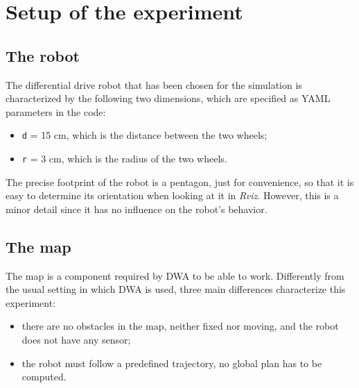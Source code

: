 \documentclass[11pt,a4paper]{article}
\begin{document}

\section{Setup of the experiment}



\subsection{The robot}

The differential drive robot that has been chosen for the simulation is characterized by the following
two dimensions, which are specified as YAML parameters in the code:
\begin{itemize}
    \item \texttt{d} = 15 cm, which is the distance between the two wheels;
    \item \texttt{r} = 3 cm, which is the radius of the two wheels.\\
\end{itemize}

The precise footprint of the robot is a pentagon, just for convenience, so that it is easy to determine its
orientation when looking at it in \textit{Rviz}.
However, this is a minor detail since it has no influence on the robot's behavior.



\subsection{The map}

The map is a component required by DWA to be able to work. Differently from the usual setting in which
DWA is used, three main differences characterize this experiment:
\begin{itemize}
    \item there are no obstacles in the map, neither fixed nor moving, and the robot does not have any sensor;
    \item the robot must follow a predefined trajectory, no global plan has to be computed.\\
\end{itemize}
\end{document}
